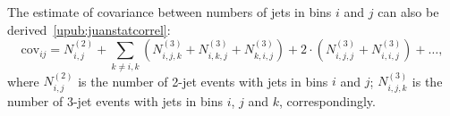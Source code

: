 The estimate of covariance between numbers of jets in bins $i$ and $j$ can also be derived~\ref{upub:juanstatcorrel}:
\begin{equation}
 \mathrm{cov}_{ij} = N_{i,j}^{\left(2\right)} + \sum_{k\neq i,k}{\left(N_{i,j,k}^{\left(3\right)} + N_{i,k,j}^{\left(3\right)} + N_{k,i,j}^{\left(3\right)} \right) + 2\cdot\left( N_{i,j,j}^{\left(3\right)} + N_{i,i,j}^{\left(3\right)} \right) + \ldots },
 \label{eq:covmultipoisson}
\end{equation}
where $N_{i,j}^{\left(2\right)}$ is the number of 2-jet events with jets in bins $i$ and $j$; $N_{i,j,k}^{\left(3\right)}$ is the number of 3-jet events with jets in bins $i$, $j$ and $k$, correspondingly.